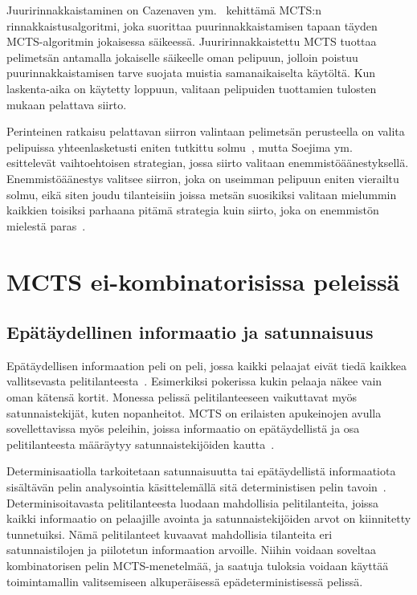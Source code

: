 \documentclass[12pt,finnish]{tktltiki2}
\theoremstyle{definition}
\theoremstyle{remark}
\begin{document}
Juuririnnakkaistaminen on Cazenaven ym.~\cite{cazenave} kehittämä MCTS:n rinnakkaistusalgoritmi, joka suorittaa puurinnakkaistamisen tapaan täyden MCTS-algoritmin jokaisessa säikeessä. Juuririnnakkaistettu MCTS tuottaa pelimetsän antamalla jokaiselle säikeelle oman pelipuun, jolloin poistuu puurinnakkaistamisen tarve suojata muistia samanaikaiselta käytöltä. Kun laskenta-aika on käytetty loppuun, valitaan pelipuiden tuottamien tulosten mukaan pelattava siirto.

Perinteinen ratkaisu pelattavan siirron valintaan pelimetsän perusteella on valita pelipuissa yhteenlasketusti eniten tutkittu solmu~\cite{browne}, mutta Soejima ym.~\cite{soejima} esittelevät vaihtoehtoisen strategian, jossa siirto valitaan enemmistöäänestyksellä. Enemmistöäänestys valitsee siirron, joka on useimman pelipuun eniten vierailtu solmu, eikä siten joudu tilanteisiin joissa metsän suosikiksi valitaan mielummin kaikkien toisiksi parhaana pitämä strategia kuin siirto, joka on enemmistön mielestä paras~\cite{soejima}.


\section{MCTS ei-kombinatorisissa peleissä}

\subsection{Epätäydellinen informaatio ja satunnaisuus}

Epätäydellisen informaation peli on peli, jossa kaikki pelaajat eivät tiedä kaikkea vallitsevasta pelitilanteesta~\cite{browne}. Esimerkiksi pokerissa kukin pelaaja näkee vain oman kätensä kortit. Monessa pelissä pelitilanteeseen vaikuttavat myös satunnaistekijät, kuten nopanheitot. MCTS on erilaisten apukeinojen avulla sovellettavissa myös peleihin, joissa informaatio on epätäydellistä ja osa pelitilanteesta määräytyy satunnaistekijöiden kautta~\cite{browne}.

Determinisaatiolla tarkoitetaan satunnaisuutta tai epätäydellistä informaatiota sisältävän pelin analysointia käsittelemällä sitä deterministisen pelin tavoin~\cite{browne}. Determinisoitavasta pelitilanteesta luodaan mahdollisia pelitilanteita, joissa kaikki informaatio on pelaajille avointa ja satunnaistekijöiden arvot on kiinnitetty tunnetuiksi. Nämä pelitilanteet kuvaavat mahdollisia tilanteita eri satunnaistilojen ja piilotetun informaation arvoille. Niihin voidaan soveltaa kombinatorisen pelin MCTS-menetelmää, ja saatuja tuloksia voidaan käyttää toimintamallin valitsemiseen alkuperäisessä epädeterministisessä pelissä.
\end{document}
